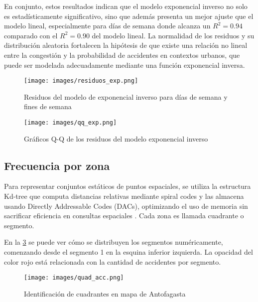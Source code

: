 \documentclass[12pt]{article}
\begin{document}
En conjunto, estos resultados indican que el modelo exponencial inverso no solo es estadísticamente significativo, sino que además presenta un mejor ajuste que el modelo lineal, especialmente para días de semana donde alcanza un $R^2 = 0.94$ comparado con el $R^2 = 0.90$ del modelo lineal. La normalidad de los residuos y su distribución aleatoria fortalecen la hipótesis de que existe una relación no lineal entre la congestión y la probabilidad de accidentes en contextos urbanos, que puede ser modelada adecuadamente mediante una función exponencial inversa.


\begin{figure}[H]
\centering
\texttt{[image: images/residuos\_exp.png]}
\caption{Residuos del modelo de exponencial inverso para días de semana y fines de semana}
\label{fig:resid_exp}
\end{figure}

\begin{figure}[H]
\centering
\texttt{[image: images/qq\_exp.png]}
\caption{Gráficos Q-Q de los residuos del modelo exponencial inverso}
\label{fig:qq_exp}
\end{figure}


\subsection{Frecuencia por zona} \label{ssec:freq_zone}

Para representar conjuntos estáticos de puntos espaciales, se utiliza la estructura Kd-tree que computa distancias relativas mediante spiral codes y las almacena usando Directly Addressable Codes (DACs), optimizando el uso de memoria sin sacrificar eficiencia en consultas espaciales \citep{gutierrez2023ckdtree}. Cada zona es llamada cuadrante o segmento.

En la \cref{fig:quad_acc} se puede ver cómo se distribuyen los segmentos numéricamente, comenzando desde el segmento 1 en la esquina inferior izquierda. La opacidad del color rojo está relacionada con la cantidad de accidentes por segmento.

\begin{figure}[H]
    \centering
    \texttt{[image: images/quad\_acc.png]}
    \caption{Identificación de cuadrantes en mapa de Antofagasta}
    \label{fig:quad_acc}
\end{figure}
\end{document}
